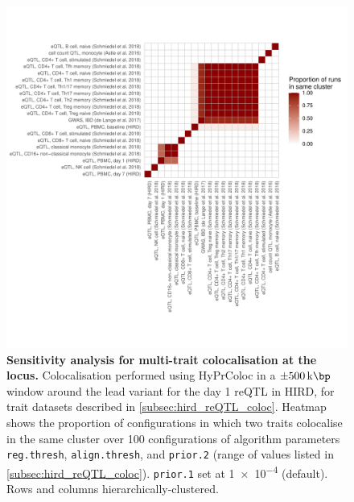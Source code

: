 \begin{figure}
    \centering
    \includegraphics[width=1.0\textwidth,page=1]{mainmatter/figures/chapter_03/perform_coloc.gene_ENSG00000138031.sensitivityPlot_custom.pdf}
    \caption[
    ]{
        \textbf{Sensitivity analysis for multi-trait colocalisation at the  locus.}
        Colocalisation performed using {HyPrColoc} \autocite{foley2019FastEfficientColocalization} in a $\pm \SI{500}{\kilo\bp}$ window around the lead variant for the day 1  \gls{reQTL} in \gls{HIRD}, for trait datasets described in \cref{subsec:hird_reQTL_coloc}.
        Heatmap shows the proportion of configurations in which two traits colocalise in the same cluster over 100 configurations of algorithm parameters
        \texttt{reg.thresh}, \texttt{align.thresh}, and \texttt{prior.2} (range of values listed in \cref{subsec:hird_reQTL_coloc}).
        \texttt{prior.1} set at \num{1e-4} (default).
        Rows and columns hierarchically-clustered.
    }
    \label{fig:hird_reQTL_coloc_ADCY3_sensitivityPlotCustom}
\end{figure}

